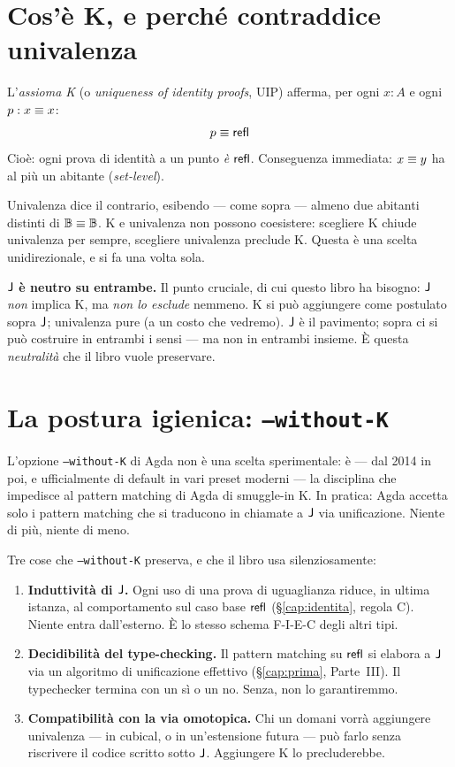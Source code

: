 \section*{Cos'\`e K, e perch\'e contraddice univalenza}

L'\emph{assioma K} (o \emph{uniqueness of identity proofs}, UIP) afferma, per ogni $x : A$ e ogni $p : x \equiv x$:
\[
p \equiv \mathsf{refl}
\]
\noindent Cio\`e: ogni prova di identit\`a a un punto \emph{\`e} $\mathsf{refl}$. Conseguenza immediata: $x \equiv y$ ha al pi\`u un abitante (\emph{set-level}).

Univalenza dice il contrario, esibendo --- come sopra --- almeno due abitanti distinti di $\mathbb{B} \equiv \mathbb{B}$. K e univalenza non possono coesistere: scegliere K chiude univalenza per sempre, scegliere univalenza preclude K. Questa \`e una scelta unidirezionale, e si fa una volta sola.

\medskip

\noindent\textbf{$\mathsf{J}$ \`e neutro su entrambe.} Il punto cruciale, di cui questo libro ha bisogno: $\mathsf{J}$ \emph{non} implica K, ma \emph{non lo esclude} nemmeno. K si pu\`o aggiungere come postulato sopra $\mathsf{J}$; univalenza pure (a un costo che vedremo). $\mathsf{J}$ \`e il pavimento; sopra ci si pu\`o costruire in entrambi i sensi --- ma non in entrambi insieme. \`E questa \emph{neutralit\`a} che il libro vuole preservare.

\section*{La postura igienica: \texttt{--without-K}}

L'opzione \texttt{--without-K} di Agda non \`e una scelta sperimentale: \`e --- dal 2014 in poi, e ufficialmente di default in vari preset moderni --- la disciplina che impedisce al pattern matching di Agda di smuggle-in K. In pratica: Agda accetta solo i pattern matching che si traducono in chiamate a $\mathsf{J}$ via unificazione. Niente di pi\`u, niente di meno.

\medskip

\noindent Tre cose che \texttt{--without-K} preserva, e che il libro usa silenziosamente:

\begin{enumerate}
\item \textbf{Induttivit\`a di $\mathsf{J}$.} Ogni uso di una prova di uguaglianza riduce, in ultima istanza, al comportamento sul caso base $\mathsf{refl}$ (\S\ref{cap:identita}, regola C). Niente entra dall'esterno. \`E lo stesso schema F-I-E-C degli altri tipi.

\item \textbf{Decidibilit\`a del type-checking.} Il pattern matching su $\mathsf{refl}$ si elabora a $\mathsf{J}$ via un algoritmo di unificazione effettivo (\S\ref{cap:prima}, Parte~III). Il typechecker termina con un s\`i o un no. Senza, non lo garantiremmo.

\item \textbf{Compatibilit\`a con la via omotopica.} Chi un domani vorr\`a aggiungere univalenza --- in cubical, o in un'estensione futura --- pu\`o farlo senza riscrivere il codice scritto sotto $\mathsf{J}$. Aggiungere K lo precluderebbe.
\end{enumerate}

